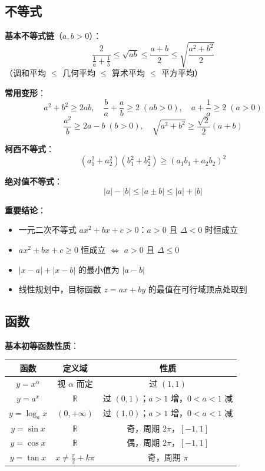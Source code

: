 \subsection{不等式}

\textbf{基本不等式链}（$a,b>0$）：
\[
\frac{2}{\frac{1}{a}+\frac{1}{b}} \le \sqrt{ab} \le \frac{a+b}{2} \le \sqrt{\frac{a^2+b^2}{2}}
\]
（调和平均 $\le$ 几何平均 $\le$ 算术平均 $\le$ 平方平均）

\textbf{常用变形}：
\[
a^2 + b^2 \ge 2ab,\quad \frac{b}{a} + \frac{a}{b} \ge 2\;(ab>0),\quad a + \frac{1}{a} \ge 2\;(a>0)
\]
\[
\frac{a^2}{b} \ge 2a - b\;(b>0),\quad \sqrt{a^2+b^2} \ge \frac{\sqrt{2}}{2}(a+b)
\]

\textbf{柯西不等式}：
\[
(a_1^2 + a_2^2)(b_1^2 + b_2^2) \ge (a_1b_1 + a_2b_2)^2
\]

\textbf{绝对值不等式}：
\[
|a| - |b| \le |a \pm b| \le |a| + |b|
\]

\textbf{重要结论}：
\begin{itemize}
  \item 一元二次不等式 $ax^2 + bx + c > 0$：$a>0$ 且 $\Delta<0$ 时恒成立
  \item $ax^2 + bx + c \ge 0$ 恒成立 $\Leftrightarrow$ $a>0$ 且 $\Delta \le 0$
  \item $|x-a| + |x-b|$ 的最小值为 $|a-b|$
  \item 线性规划中，目标函数 $z = ax+by$ 的最值在可行域顶点处取到
\end{itemize}

\subsection{函数}

\textbf{基本初等函数性质}：

\begin{center}
\begin{tabular}{c|c|c}
函数 & 定义域 & 性质 \\ \hline
$y = x^\alpha$ & 视 $\alpha$ 而定 & 过 $(1,1)$\\
$y = a^x$ & $\mathbb{R}$ & 过 $(0,1)$；$a>1$ 增，$0<a<1$ 减\\
$y = \log_a x$ & $(0,+\infty)$ & 过 $(1,0)$；$a>1$ 增，$0<a<1$ 减\\
$y = \sin x$ & $\mathbb{R}$ & 奇，周期 $2\pi$，$[-1,1]$\\
$y = \cos x$ & $\mathbb{R}$ & 偶，周期 $2\pi$，$[-1,1]$\\
$y = \tan x$ & $x\neq\frac{\pi}{2}+k\pi$ & 奇，周期 $\pi$\\
\end{tabular}
\end{center}

